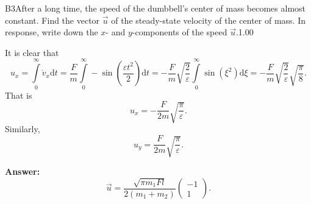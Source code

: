 \documentclass[11pt,a4paper]{article}
\begin{document}
\begin{solcard}{B3}{After a long time, the speed of the dumbbell's center of mass becomes almost constant. Find the vector $\vec{u}$ of the steady-state velocity of the center of mass. In response, write down the $x$- and $y$-components of the speed $\vec{u}$.}{1.00}

It is clear that $$u_x = \int\limits_0^{\infty}\dot{v}_x\mathrm{d}t = \frac{F}{m} \int\limits_0^{\infty}-\sin\left(\frac{\varepsilon t^2}{2}\right)\mathrm{d}t = -\frac{F}{m}\sqrt{\frac{2}{\varepsilon}} \int\limits_0^{\infty}\sin\left(\xi^2\right)\mathrm{d}\xi = -\frac{F}{m}\sqrt{\frac{2}{\varepsilon}}\sqrt{\frac{\pi}{8}}.$$That is $$u_x = -\frac{F}{2m}\sqrt{\frac{\pi}{\varepsilon}}.$$Similarly, $$u_y = \frac{F}{2m}\sqrt{\frac{\pi}{\varepsilon}}.$$

\par\smallskip\noindent\textbf{Answer:} \begin{equation} \vec{u} = \frac{\sqrt{\pi m_1Fl}}{2(m_1 + m_2)} \begin{pmatrix} -1\\ 1 \end{pmatrix}. \end{equation}
\end{solcard}
\end{document}
